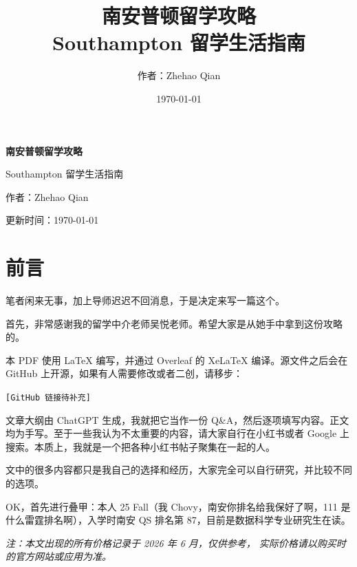\documentclass[UTF8,12pt,a4paper]{ctexart}
\title{
    \vspace{2cm}
    {\Huge\bfseries 南安普顿留学攻略}\\[0.5cm]
    {\Large Southampton 留学生活指南}
}
\author{作者：Zhehao Qian}
\date{\today}
\begin{document}
\begin{titlepage}
    \centering

    \vspace*{4cm}

    {\Huge\bfseries\color{mainblue} 南安普顿留学攻略\par}

    \vspace{0.8cm}

    {\Large Southampton 留学生活指南\par}

    \vfill

    {\large 作者：Zhehao Qian\par}

    \vspace{0.3cm}

    {\large 更新时间：\today\par}

    \vspace{2cm}
\end{titlepage}

\tableofcontents
\clearpage

\section{前言}

笔者闲来无事，加上导师迟迟不回消息，于是决定来写一篇这个。

首先，非常感谢我的留学中介老师吴悦老师。希望大家是从她手中拿到这份攻略的。

本 PDF 使用 \LaTeX{} 编写，并通过 Overleaf 的 XeLaTeX 编译。源文件之后会在 GitHub 上开源，如果有人需要修改或者二创，请移步：

\begin{center}
    \texttt{[GitHub 链接待补充]}
\end{center}

文章大纲由 ChatGPT 生成，我就把它当作一份 Q\&A，然后逐项填写内容。正文均为手写。至于一些我认为不太重要的内容，请大家自行在小红书或者 Google 上搜索。本质上，我就是一个把各种小红书帖子聚集在一起的人。

文中的很多内容都只是我自己的选择和经历，大家完全可以自行研究，并比较不同的选项。

OK，首先进行叠甲：本人 25 Fall（我 Chovy，南安你排名给我保好了啊，111 是什么雷霆排名啊），入学时南安 QS 排名第 87，目前是数据科学专业研究生在读。

\textit{注：本文出现的所有价格记录于 2026 年 6 月，仅供参考，
实际价格请以购买时的官方网站或应用为准。}
\end{document}
